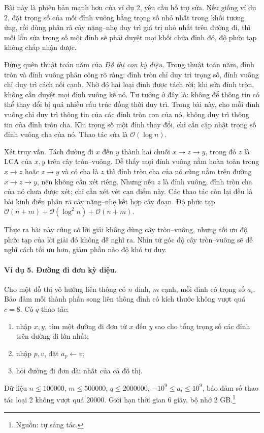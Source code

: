 \documentclass[11pt]{article}
\newcommand{\Oh}{\mathcal{O}}
\begin{document}
Bài này là phiên bản mạnh hơn của ví dụ 2, yêu cầu hỗ trợ sửa. Nếu giống ví dụ
2, đặt trọng số của mỗi đỉnh vuông bằng trọng số nhỏ nhất trong khối tương
ứng, rồi dùng phân rã cây nặng--nhẹ duy trì giá trị nhỏ nhất trên đường đi,
thì mỗi lần sửa trọng số một đỉnh sẽ phải duyệt mọi khối chứa đỉnh đó, độ
phức tạp không chấp nhận được.

Đừng quên thuật toán năm của \emph{Đồ thị con kỳ diệu}. Trong thuật toán năm,
đỉnh tròn và đỉnh vuông phân công rõ ràng: đỉnh tròn chỉ duy trì trọng số,
đỉnh vuông chỉ duy trì cách nối cạnh. Nhờ đó hai loại đỉnh được tách rời; khi
sửa đỉnh tròn, không cần duyệt mọi đỉnh vuông kề nó. Tư tưởng ở đây là: không
để thông tin có thể thay đổi bị quá nhiều cấu trúc đồng thời duy trì. Trong
bài này, cho mỗi đỉnh vuông chỉ duy trì thông tin của các đỉnh tròn con của
nó, không duy trì thông tin của đỉnh tròn cha. Khi trọng số một đỉnh thay đổi,
chỉ cần cập nhật trọng số đỉnh vuông cha của nó. Thao tác sửa là
\(\Oh(\log n)\).

Xét truy vấn. Tách đường đi \(x\) đến \(y\) thành hai chuỗi \(x\to z\to y\),
trong đó \(z\) là LCA của \(x,y\) trên cây tròn--vuông. Dễ thấy mọi đỉnh vuông
nằm hoàn toàn trong \(x\to z\) hoặc \(z\to y\) và có cha là \(z\) thì đỉnh
tròn cha của nó cũng nằm trên đường \(x\to z\to y\), nên không cần xét riêng.
Nhưng nếu \(z\) là đỉnh vuông, đỉnh tròn cha của nó chưa được xét; chỉ cần xét
vét cạn điểm này. Các thao tác còn lại đều là bài kinh điển phân rã cây
nặng--nhẹ kết hợp cây đoạn. Độ phức tạp
\(\Oh(n+m)+\Oh(\log^2 n)+\Oh(n+m)\).

Thực ra bài này cũng có lời giải không dùng cây tròn--vuông, nhưng tối ưu độ
phức tạp của lời giải đó không dễ nghĩ ra. Nhìn từ góc độ cây tròn--vuông sẽ
dễ nghĩ cách tối ưu hơn, giảm phần nào độ khó tư duy.

\paragraph{Ví dụ 5. Đường đi đơn kỳ diệu.}
Cho một đồ thị vô hướng liên thông có \(n\) đỉnh, \(m\) cạnh, mỗi đỉnh có
trọng số \(a_i\). Bảo đảm mỗi thành phần song liên thông đỉnh có kích thước
không vượt quá \(c=8\). Có \(q\) thao tác:
\begin{enumerate}
  \item nhập \(x,y\), tìm một đường đi đơn từ \(x\) đến \(y\) sao cho tổng
  trọng số các đỉnh trên đường đi lớn nhất;
  \item nhập \(p,v\), đặt \(a_p\gets v\);
  \item hỏi đường đi đơn dài nhất của cả đồ thị.
\end{enumerate}
Dữ liệu \(n\le 100000\), \(m\le 500000\), \(q\le 2000000\),
\(-10^9\le a_i\le 10^9\), bảo đảm số thao tác loại 2 không vượt quá \(20000\).
Giới hạn thời gian \(6\) giây, bộ nhớ \(2\) GB.\footnote{Nguồn: tự sáng tác.}
\end{document}
